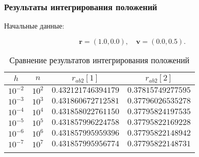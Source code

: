 \begin{frame}
\frametitle{Результаты интегрирования положений}

Начальные данные:

\su
\begin{equation}
  \mathbf{r} = (1.0, 0.0), \quad \mathbf{v} = (0.0, 0.5).
\end{equation}

\begin{table}[h]
  \centering
  \caption{Сравнение результатов интегрирования положений}
  \begin{tabular}{cccc}
    \toprule
    $ h $ &
    $ n $ &
    $ r_{ab2}[1] $ &
    $ r_{ab2}[2] $ \\
    \midrule
    $ 10^{-2} $ & $ 10^2 $ & $ 0.432121746394179 $ & $ 0.37815749277595 $ \\
    \arrayrulecolor{black!40}
    \midrule
    $ 10^{-3} $ & $ 10^3 $ & $ 0.431860672712581 $ & $ 0.37796026535278 $ \\
    \midrule
    $ 10^{-4} $ & $ 10^4 $ & $ 0.431858022761150 $ & $ 0.37795824197535 $ \\
    \midrule
    $ 10^{-5} $ & $ 10^5 $ & $ 0.431857996224758 $ & $ 0.37795822169228 $ \\
    \midrule
    $ 10^{-6} $ & $ 10^6 $ & $ 0.431857995959396 $ & $ 0.37795822148942 $ \\
    \midrule
    $ 10^{-7} $ & $ 10^7 $ & $ 0.431857995956774 $ & $ 0.37795822148731 $ \\
    \arrayrulecolor{black}
    \bottomrule
  \end{tabular}
\end{table}

\end{frame}

